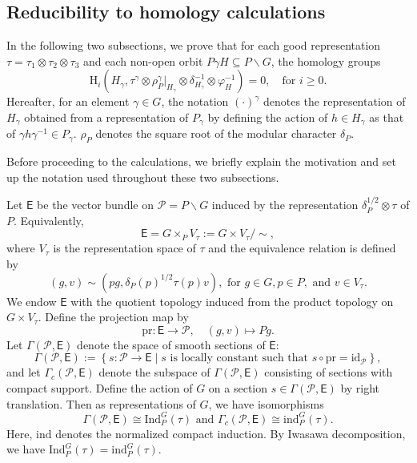 \documentclass[12pt]{amsart}
\newcommand{\RH}{{\mathrm {H}}}
\newcommand{\Ind}{{\mathrm{Ind}}}
\theoremstyle{Theorem}
\theoremstyle{Theorem}
\theoremstyle{Theorem}
\theoremstyle{Theorem}
\theoremstyle{Plain}
\theoremstyle{remark}
\theoremstyle{remark}
\theoremstyle{Definition}
\begin{document}
\subsection{Reducibility to homology calculations}

In the following two subsections, we prove that for each good representation $ \tau = \tau_1 \otimes \tau_2 \otimes \tau_3 $ and each non-open orbit $ P \gamma H \subseteq P \backslash G $, the homology groups 
\begin{equation}
    \label{targetspaces}
    \RH_i \left( H_\gamma, \tau^\gamma \otimes \rho_P^\gamma|_{ H_\gamma } \otimes \delta^{-1}_{ H_\gamma } \otimes \varphi_H^{-1} \right) = 0,\quad \text{for } i \geq 0.
\end{equation}
Hereafter, for an element $\gamma\in G$, the notation $ ( \cdot )^\gamma $ denotes the representation of $ H_\gamma $ obtained from a representation of $ P_\gamma $ by defining the action of $ h \in H_\gamma $ as that of $ \gamma h \gamma^{-1} \in P_\gamma $. $\rho_P$ denotes the square root of the modular character $\delta_P$.

Before proceeding to the calculations, we briefly explain the motivation and set up the notation used throughout these two subsections. 

Let $\mathsf{E}$ be the vector bundle on $ \mathcal{P} = P \backslash G$ induced by the representation $ \delta_P^{1/2} \otimes \tau $ of $P$. Equivalently,
\[
    \mathsf{E} = G \times_P V_\tau := G \times V_\tau / \sim,
\]
where $V_\tau$ is the representation space of $\tau$ and the equivalence relation is defined by 
\[
    (g, v) \sim ( pg, \delta_P(p)^{1/2} \tau(p) v ), \text{ for } g \in G, p \in P, \text{ and } v \in V_\tau.
\]
We endow $\mathsf{E}$ with the quotient topology induced from the product topology on $ G \times V_\tau $. Define the projection map by
\[
    \mathrm{pr}: \mathsf{E} \rightarrow \mathcal{P}, \quad (g, v) \mapsto Pg.
\]
Let $ \Gamma( \mathcal{P}, \mathsf{E} ) $ denote the space of smooth sections of $\mathsf{E}$:
\[
    \Gamma( \mathcal{P}, \mathsf{E} ) := \left\{ s: \mathcal{P} \rightarrow \mathsf{E} \mid s\text{ is locally constant such that } s \circ \mathrm{pr} = \mathrm{id}_{ \mathcal{P} } \right\},
\]
and let $ \Gamma_c ( \mathcal{P}, \mathsf{E} ) $ denote the subspace of $ \Gamma ( \mathcal{P}, \mathsf{E} ) $ consisting of sections with compact support. Define the action of $G$ on a section $ s \in \Gamma( \mathcal{P}, \mathsf{E} ) $ by right translation. Then as representations of $G$, we have isomorphisms
\begin{equation}
    \label{indandsec}
    \Gamma( \mathcal{P}, \mathsf{E} ) \cong \Ind^G_P ( \tau ) \text{ and } \Gamma_c ( \mathcal{P}, \mathsf{E} ) \cong \mathrm{ind}^G_P ( \tau ).
\end{equation}
Here, $\mathrm{ind}$ denotes the normalized compact induction. By Iwasawa decomposition, we have $ \Ind^G_P ( \tau ) = \mathrm{ind}^G_P ( \tau ) $.
\end{document}
